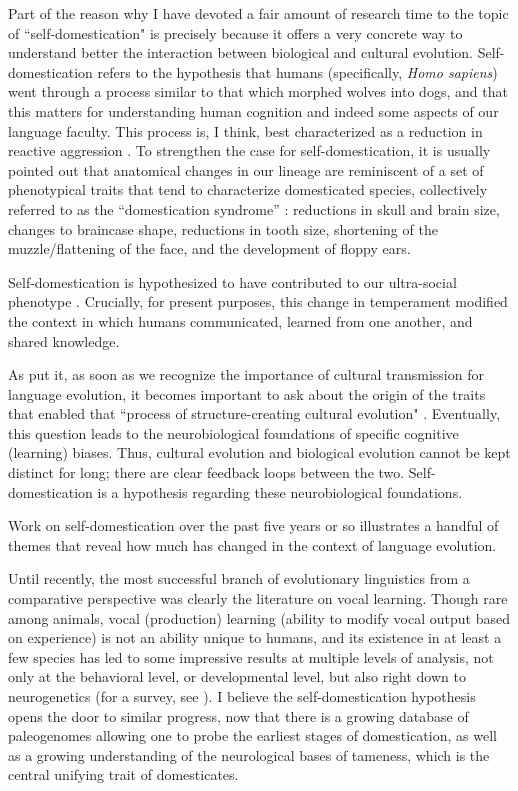 Part of the reason why I have devoted a fair amount of research time to the topic of ``self-domestication" is precisely because it offers a very concrete way to understand better the interaction between biological and cultural evolution. Self-domestication refers to the hypothesis that humans (specifically, \textit{Homo sapiens}) went through a process similar to that which morphed wolves into dogs, and that this matters for understanding human cognition and indeed some aspects of our language faculty. This process is, I think, best characterized as a reduction in reactive aggression \citep{wrangham2018two}. To strengthen the case for self-domestication, it is usually pointed out \citep{theofanopoulou2017self} that anatomical changes in our lineage are reminiscent of a set of phenotypical traits that tend to characterize domesticated species, collectively referred to as the ``domestication syndrome'' \citep{wilkins2014domestication}: reductions in skull and brain size, changes to braincase shape, reductions in tooth size, shortening of the muzzle/flattening of the face, and the development of floppy ears.

Self-domestication is hypothesized to have contributed to our ultra-social phenotype \citep{hare2017survival}. Crucially, for present purposes, this change in temperament modified the context in which humans communicated, learned from one another, and shared knowledge.

As \cite{thomas2014self} put it, as soon as we recognize the importance of cultural transmission for language evolution, it becomes important to ask about the origin of the traits that enabled that ``process of structure-creating cultural evolution" \citep{thomas2018self}. Eventually, this question leads to the neurobiological foundations of specific cognitive (learning) biases. Thus, cultural evolution and biological evolution cannot be kept distinct for long; there are clear feedback loops between the two. Self-domestication is a hypothesis regarding these neurobiological foundations.

Work on self-domestication over the past five years or so illustrates a handful of themes that reveal how much has changed in the context of language evolution. 

Until recently, the most successful branch of evolutionary linguistics from a comparative perspective was clearly the literature on vocal learning. Though rare among animals, vocal (production) learning (ability to modify vocal output based on experience) is not an ability unique to humans, and its existence in at least a few species has led to some impressive results at multiple levels of analysis, not only at the behavioral level, or developmental level, but also right down to neurogenetics (for a survey, see \cite{jarvis2019evolution}). I believe the self-domestication hypothesis opens the door to similar progress, now that there is a growing database of paleogenomes allowing one to probe the earliest stages of domestication, as well as a growing understanding of the neurological bases of tameness, which is the central unifying trait of domesticates. 

